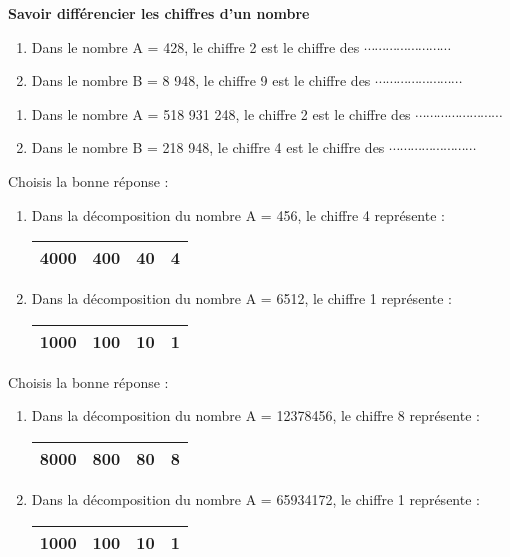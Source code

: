 







\textbf{Savoir différencier les chiffres d'un nombre}


\begin{enumerate}
\item Dans le nombre A = 428, le chiffre 2 est le chiffre des $\cdots\cdots\cdots\cdots\cdots\cdots\cdots\cdots$
\item Dans le nombre B = 8 948, le chiffre 9 est le chiffre des $\cdots\cdots\cdots\cdots\cdots\cdots\cdots\cdots$
\end{enumerate}



\begin{enumerate}
\item Dans le nombre A = 518 931 248, le chiffre 2 est le chiffre des $\cdots\cdots\cdots\cdots\cdots\cdots\cdots\cdots$
\item Dans le nombre B = 218 948, le chiffre 4 est le chiffre des $\cdots\cdots\cdots\cdots\cdots\cdots\cdots\cdots$
\end{enumerate}




Choisis la bonne réponse :
\begin{enumerate}
\item Dans la décomposition du nombre A = 456, le chiffre 4 représente :
\begin{tabular}{|c|c|c|c|}
\hline 
4000 & 400 & 40 & 4 \\ 
\hline 
\end{tabular}  

\item Dans la décomposition du nombre A = 6512, le chiffre 1 représente :
\begin{tabular}{|c|c|c|c|}
\hline 
1000 & 100 & 10 & 1 \\ 
\hline 
\end{tabular} 
\end{enumerate}



Choisis la bonne réponse :
\begin{enumerate}
\item Dans la décomposition du nombre A = 12378456, le chiffre 8 représente :
\begin{tabular}{|c|c|c|c|}
\hline 
8000 & 800 & 80 & 8 \\ 
\hline 
\end{tabular}  

\item Dans la décomposition du nombre A = 65934172, le chiffre 1 représente :
\begin{tabular}{|c|c|c|c|}
\hline 
1000 & 100 & 10 & 1 \\ 
\hline 
\end{tabular} 
\end{enumerate}


